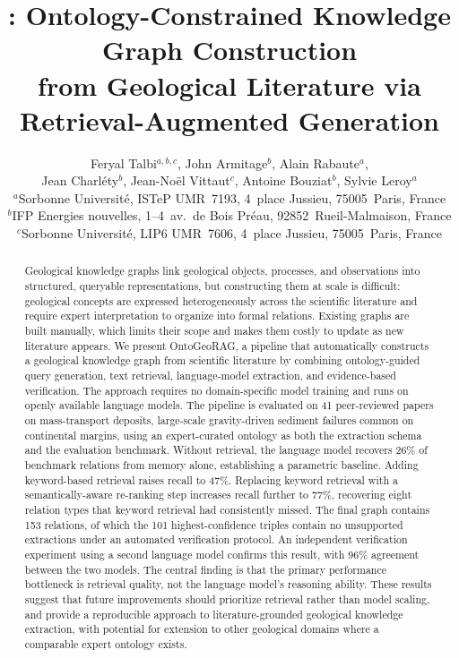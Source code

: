 \documentclass[10pt]{article}
\title{\vspace{-1.2em}
\textbf{\method: Ontology-Constrained Knowledge Graph Construction\\
from Geological Literature via Retrieval-Augmented Generation}
\vspace{-0.8em}}
\author{
Feryal Talbi$^{a,b,c}$,
John Armitage$^b$, Alain Rabaute$^a$,\\
Jean Charl\'ety$^b$, Jean-No\"el Vittaut$^c$,
Antoine Bouziat$^b$, Sylvie Leroy$^a$\\[5pt]
$^a$Sorbonne Universit\'e, ISTeP UMR~7193,
 4~place Jussieu, 75005~Paris, France\\
$^b$IFP Energies nouvelles,
 1--4~av.\ de Bois Pr\'eau, 92852~Rueil-Malmaison, France\\
$^c$Sorbonne Universit\'e, LIP6 UMR~7606,
 4~place Jussieu, 75005~Paris, France
}
\date{\vspace{-1em}}
\newcommand{\method}{OntoGeoRAG}
\begin{document}
\maketitle

\begin{abstract}



Geological knowledge graphs link geological objects, processes, and observations into structured, queryable representations, but constructing them at scale is difficult: geological concepts are expressed heterogeneously across the scientific literature and require expert interpretation to organize into formal relations. Existing graphs are built manually, which limits their scope and makes them costly to update as new literature appears.
We present \method{}, a pipeline that automatically constructs a geological knowledge graph from scientific literature by combining ontology-guided query generation, text retrieval, language-model extraction, and evidence-based verification. The approach requires no domain-specific model training and runs on openly available language models.
The pipeline is evaluated on 41 peer-reviewed papers on mass-transport deposits, large-scale gravity-driven sediment failures common on continental margins, using an expert-curated ontology as both the extraction schema and the evaluation benchmark. Without retrieval, the language model recovers 26\% of benchmark relations from memory alone, establishing a parametric baseline. Adding keyword-based retrieval raises recall to 47\%. Replacing keyword retrieval with a semantically-aware re-ranking step increases recall further to 77\%, recovering eight relation types that keyword retrieval had consistently missed. The final graph contains 153 relations, of which the 101 highest-confidence triples contain no unsupported extractions under an automated verification protocol. An independent verification experiment using a second language model confirms this result, with 96\% agreement between the two models.
The central finding is that the primary performance bottleneck is retrieval quality, not the language model's reasoning ability. These results suggest that future improvements should prioritize retrieval rather than model scaling, and provide a reproducible approach to literature-grounded
geological knowledge extraction, with potential for
extension to other geological domains where a comparable
expert ontology exists.
\end{abstract}
\end{document}
